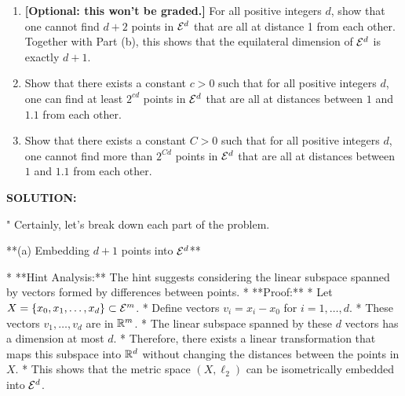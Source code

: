 \begin{enumerate}
\begin{enumerate}
\item {} \textbf{[Optional: this won't be graded.]}
For all positive integers $d$, show that one cannot find $d+2$ points in $\mathcal{E}^d$
that are all at distance 1 from each other. 
Together with Part (b), this shows that the equilateral dimension of $\mathcal{E}^d$ is exactly $d+1$.\\

\item {} Show that there exists a constant $c > 0$ such that for all positive integers $d$,
one can find at least $2^{cd}$ points in $\mathcal{E}^d$ that are all at distances between $1$ and $1.1$ from each other.

\item {} Show that there exists a constant $C > 0$ such that for all positive integers $d$,
one cannot find more than $2^{Cd}$ points in $\mathcal{E}^d$ that are all at distances between $1$ and $1.1$ from each other.\\

\end{enumerate}

\ifdefined\template
\begin{shaded}
\textbf{SOLUTION:}
\ifdefined\sol


"
Certainly, let's break down each part of the problem.

**(a) Embedding $d+1$ points into $\mathcal{E}^d$**

* **Hint Analysis:** The hint suggests considering the linear subspace spanned by vectors formed by differences between points.
* **Proof:**
    * Let $X = \{x_0, x_1, \ldots, x_d\} \subset \mathcal{E}^m$.
    * Define vectors $v_i = x_i - x_0$ for $i = 1, \ldots, d$.
    * These vectors $v_1, \ldots, v_d$ are in $\mathbb{R}^m$.
    * The linear subspace spanned by these $d$ vectors has a dimension at most $d$.
    * Therefore, there exists a linear transformation that maps this subspace into $\mathbb{R}^d$ without changing the distances between the points in $X$.
    * This shows that the metric space $(X, \ell_2)$ can be isometrically embedded into $\mathcal{E}^d$.


\end{shaded}
\end{enumerate}

